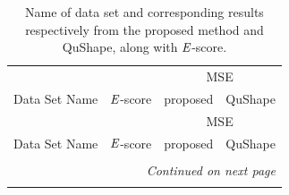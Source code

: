 \documentclass[letter]{bioinfo}
\newcommand{\escore}{{\emph{E}}}
\begin{document}
\begin{center}
\begin{longtable}{l ccc}

\caption{Name of data set and corresponding results respectively from the proposed method and QuShape, along with $\escore$-score.} \label{t:95_data_sets} \\
 & & \multicolumn{2}{c}{MSE} \\
Data Set Name & $\escore$-score & \multicolumn{1}{c}{proposed} & QuShape \\\hline
\endfirsthead

 & & \multicolumn{2}{c}{MSE} \\
Data Set Name & $\escore$-score & \multicolumn{1}{c}{proposed} & QuShape \\\hline
\endhead

\\
\multicolumn{4}{r}{\textit{Continued on next page}} \\
\endfoot
\endlastfoot



\end{longtable}
\end{center}
\end{document}
